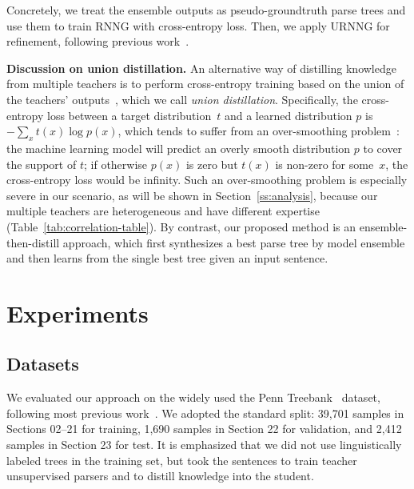 \documentclass{article}
\begin{document}
Concretely, we treat the ensemble outputs as pseudo-groundtruth parse trees and use them to train RNNG with cross-entropy loss. Then, we apply URNNG for refinement, following previous work~\citep{kim-etal-2019-compound,cao-etal-2020-unsupervised}.

\textbf{Discussion on union distillation.}
\label{discussion:uniondistill}
An alternative way of distilling knowledge from multiple teachers is to perform cross-entropy training based on the union of the teachers' outputs~\citep{wu-etal-2021-one}, which we call \textit{union distillation}. Specifically, the cross-entropy loss between a target distribution~$t$ and a learned distribution $p$ is $-\sum_x t(x)\log p(x)$, which tends to suffer from  an over-smoothing problem~\citep{WeiDialogGenerateShort,wen2022equal,wen-etal-2023-f}: the machine learning model will predict an overly smooth distribution $p$ to cover the support of $t$; if otherwise $p(x)$ is zero but $t(x)$ is non-zero for some~$x$, the cross-entropy loss would be infinity. Such an over-smoothing problem is especially severe in our scenario, as will be shown in Section~\ref{ss:analysis}, because our multiple teachers are heterogeneous and have different expertise (Table~\ref{tab:correlation-table}). By contrast, our proposed method is an ensemble-then-distill approach, which first synthesizes a best parse tree by model ensemble and then learns from the single best tree given an input sentence.


\section{Experiments}

\subsection{Datasets}

We evaluated our approach on the widely used the Penn Treebank~\citep[PTB;][]{marcus-etal-1993-building} dataset, following most previous work~\citep{shen2018ordered,kim-etal-2019-compound,cao-etal-2020-unsupervised,maveli-cohen-2022-co,li-lu-2023-contextual}. We adopted the standard split: 39,701 samples in Sections 02--21 for training, 1,690 samples in Section 22 for validation, and 2,412 samples in Section 23 for test. It is emphasized that we did not use linguistically labeled trees in the training set, but took the sentences to train teacher unsupervised parsers and to distill knowledge into the student.
\end{document}
